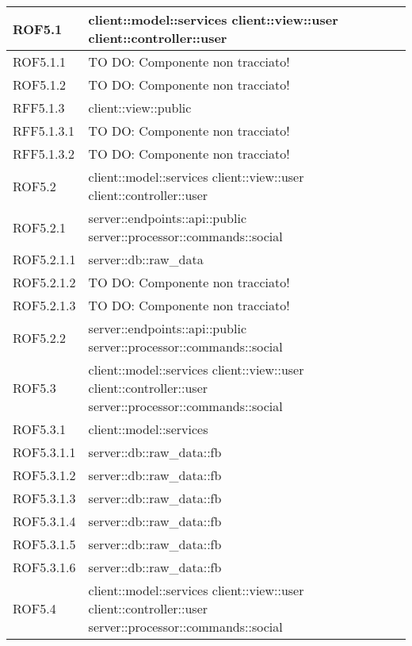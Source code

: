 \begin{center}
\begin{longtable}{| p{4cm} | p{8cm} |}
\hline
ROF5.1 & client::model::services \newline client::view::user \newline client::controller::user \\
\hline
ROF5.1.1 & TO DO: Componente non tracciato! \\
\hline
ROF5.1.2 & TO DO: Componente non tracciato! \\
\hline
RFF5.1.3 & client::view::public \\
\hline
RFF5.1.3.1 & TO DO: Componente non tracciato! \\
\hline
RFF5.1.3.2 & TO DO: Componente non tracciato! \\
\hline
ROF5.2 & client::model::services \newline client::view::user \newline client::controller::user \\
\hline
ROF5.2.1 & server::endpoints::api::public \newline server::processor::commands::social \\
\hline
ROF5.2.1.1 & server::db::raw\_data \\
\hline
ROF5.2.1.2 & TO DO: Componente non tracciato! \\
\hline
ROF5.2.1.3 & TO DO: Componente non tracciato! \\
\hline
ROF5.2.2 & server::endpoints::api::public \newline server::processor::commands::social \\
\hline
ROF5.3 & client::model::services \newline client::view::user \newline client::controller::user \newline server::processor::commands::social \\
\hline
ROF5.3.1 & client::model::services \\
\hline
ROF5.3.1.1 & server::db::raw\_data::fb \\
\hline
ROF5.3.1.2 & server::db::raw\_data::fb \\
\hline
ROF5.3.1.3 & server::db::raw\_data::fb \\
\hline
ROF5.3.1.4 & server::db::raw\_data::fb \\
\hline
ROF5.3.1.5 & server::db::raw\_data::fb \\
\hline
ROF5.3.1.6 & server::db::raw\_data::fb \\
\hline
ROF5.4 & client::model::services \newline client::view::user \newline client::controller::user \newline server::processor::commands::social \\

\end{longtable}
\end{center}
